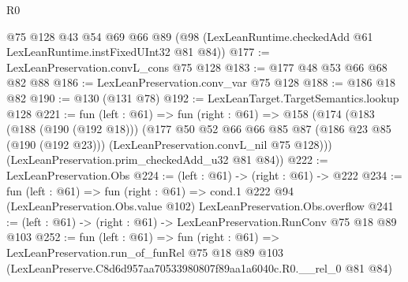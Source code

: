 \begin{lexlean}{R0}
\begin{coremodule}
    @75
    @128
    @43
    @54
    @69
    @66
    @89
    (@98 (LexLeanRuntime.checkedAdd @61 LexLeanRuntime.instFixedUInt32 @81 @84))
@177 := LexLeanPreservation.convL_cons @75 @128
@183 := @177 @48 @53 @66 @68 @82 @88
@186 := LexLeanPreservation.conv_var @75 @128
@188 := @186 @18 @82
@190 := @130 (@131 @78)
@192 := LexLeanTarget.TargetSemantics.lookup @128
@221 := fun (left : @61) =>
  fun (right : @61) =>
  @158
    (@174
      (@183
        (@188 (@190 (@192 @18)))
        (@177
          @50
          @52
          @66
          @66
          @85
          @87
          (@186 @23 @85 (@190 (@192 @23)))
          (LexLeanPreservation.convL_nil @75 @128)))
      (LexLeanPreservation.prim_checkedAdd_u32 @81 @84))
@222 := LexLeanPreservation.Obs
@224 := (left : @61) -> (right : @61) -> @222
@234 := fun (left : @61) =>
  fun (right : @61) =>
  cond.{1} @222 @94 (LexLeanPreservation.Obs.value @102) LexLeanPreservation.Obs.overflow
@241 := (left : @61) -> (right : @61) -> LexLeanPreservation.RunConv @75 @18 @89 @103
@252 := fun (left : @61) =>
  fun (right : @61) =>
  LexLeanPreservation.run_of_funRel
    @75
    @18
    @89
    @103
    (LexLeanPreserve.C8d6d957aa70533980807f89aa1a6040c.R0.__rel_0 @81 @84)
\end{coremodule}
\end{lexlean}
